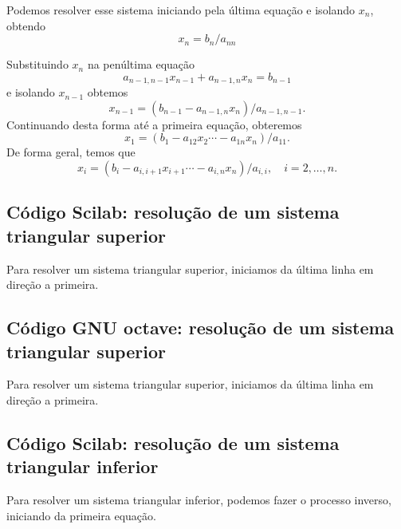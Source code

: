 Podemos resolver esse sistema iniciando pela última equação e isolando $x_n$, obtendo
\begin{equation}
 x_n = b_n/a_{nn}
\end{equation}

Substituindo $x_n$ na penúltima equação
\begin{equation}
 a_{n-1,n-1}x_{n-1}+a_{n-1,n}x_n = b_{n-1}
\end{equation}
e isolando $x_{n-1}$ obtemos
\begin{equation}
 x_{n-1} = (b_{n-1}-a_{n-1,n}x_n)/a_{n-1,n-1}.
\end{equation}
Continuando desta forma até a primeira equação, obteremos
\begin{equation}
 x_{1} = (b_{1}-a_{12}x_2 \cdots -a_{1n}x_n)/a_{11}.
\end{equation}
De forma geral, temos que
\begin{equation}
 x_{i} = (b_{i}-a_{i,i+1}x_{i+1} \cdots -a_{i,n}x_n)/a_{i,i}, \quad i=2,\dots,n.
\end{equation}

\ifisscilab
\subsection{Código Scilab: resolução de um sistema triangular superior}

Para resolver um sistema triangular superior, iniciamos da última linha em direção a primeira.


\fi

\ifisoctave
\subsection{Código GNU octave: resolução de um sistema triangular superior}

Para resolver um sistema triangular superior, iniciamos da última linha em direção a primeira.


\fi

\ifisscilab
\subsection{Código Scilab: resolução de um sistema triangular inferior}
Para resolver um sistema triangular inferior, podemos fazer o processo inverso, iniciando da primeira equação.

